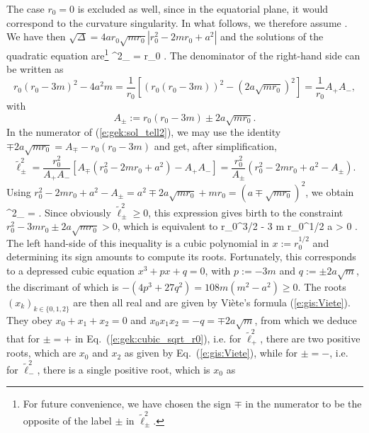 The case $r_0=0$ is excluded as well, since in the equatorial plane, it would
correspond to the curvature singularity. In what follows, we therefore assume
\be \label{e:gek:circ_r0_positive}
    .
\ee
We have then $\sqrt{\mathit{\Delta}} = 4 a r_0 \sqrt{m r_0} |r_0^2 - 2m r_0 + a^2|$
and the solutions of the quadratic equation are\footnote{For future convenience, we have
chosen the sign $\mp$ in the numerator to be the opposite of the label $\pm$
in $\tilde{\ell}^2_{\pm}$.}
\be \label{e:gek:sol_tell2}
    \tilde{\ell}^2_{\pm} = r_0  .
\ee
The denominator of the right-hand side can be written as
\[
    r_0 (r_0 - 3m)^2  - 4 a^2 m = \frac{1}{r_0} \left[
        \left( r_0 (r_0 - 3m) \right) ^2 - \left( 2 a \sqrt{m r_0} \right) ^2 \right]
        = \frac{1}{r_0} A_+ A_- ,
\]
with
\[
    A_\pm := r_0 (r_0 - 3m) \pm 2 a \sqrt{m r_0} .
\]
In the numerator of (\ref{e:gek:sol_tell2}), we may use the identity
$\mp 2 a \sqrt{m r_0} = A_\mp - r_0 (r_0 - 3m)$ and get, after
simplification,
\[
    \tilde{\ell}^2_{\pm} = \frac{r_0^2}{A_+ A_-} \left[ A_\mp (r_0^2 - 2m r_0 + a^2)
     - A_+ A_- \right] = \frac{r_0^2}{A_\pm} \left(
        r_0^2 - 2m r_0 + a^2 - A_\pm \right) .
\]
Using $r_0^2 - 2m r_0 + a^2 - A_\pm  =  a^2 \mp 2a \sqrt{m r_0} + m r_0 =
(a \mp \sqrt{m r_0})^2$, we obtain
\be \label{e:gek:tell2_circ}
    \tilde{\ell}^2_{\pm} =  .
\ee
Since obviously $\tilde{\ell}^2_{\pm} \geq 0$, this expression gives birth to
the constraint $r_0^2 - 3m r_0 \pm 2 a \sqrt{m r_0} > 0$,
which is equivalent to
\be \label{e:gek:cubic_sqrt_r0}
    r_0^{3/2} - 3 m r_0^{1/2}   a  > 0 .
\ee
The left hand-side of this inequality is a cubic polynomial in $x:=r_0^{1/2}$
and determining its sign amounts to compute its roots. Fortunately, this
corresponds to
a depressed cubic equation $x^3 + px + q = 0$, with $p:= -3m$ and $q:=\pm 2 a \sqrt{m}$,
the discrimant of which is $-(4 p^3 + 27 q^2) = 108 m (m^2 - a^2) \geq 0$. The roots
$(x_k)_{k\in\{0,1,2\}}$ are then all real and are given by Viète's formula (\ref{e:gis:Viete}).
They obey $x_0 + x_1 + x_2 = 0$ and $x_0 x_1 x_2 = -q = \mp 2 a \sqrt{m}$,
from which we deduce that for $\pm = +$ in Eq.~(\ref{e:gek:cubic_sqrt_r0}), i.e. for
$\tilde{\ell}^2_+$, there are two positive roots, which are $x_0$ and $x_2$
as given by Eq.~(\ref{e:gis:Viete}), while for $\pm = -$, i.e. for
$\tilde{\ell}^2_-$, there is a single positive root, which is $x_0$ as

